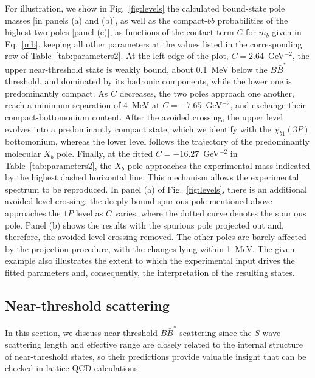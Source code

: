 \documentclass[aps,prd,showpacs,amsmath,twocolumn,superscriptaddress,floatfix,nofootinbib,notitlepage]{revtex4-2}
\newcommand{\Xb}{X_b}
\begin{document}
For illustration, we show in Fig.~\ref{fig:levels} the calculated bound-state pole masses [in panels (a) and (b)], as well as the compact-$\bar{b}b$ probabilities of the highest two poles [panel (c)], as functions of the contact term $C$ for $m_b$ given in Eq.~\eqref{mb}, keeping all other parameters at the values listed in the corresponding row of Table~\ref{tab:parameters2}.
At the left edge of the plot, $C=2.64$~GeV$^{-2}$, the upper near-threshold state is weakly bound, about 0.1~MeV below the $B\bar{B}^*$ threshold, and dominated by its hadronic components, while the lower one is predominantly compact. As $C$ decreases, the two poles approach one another, reach a minimum separation of 4~MeV at $C=-7.65$~GeV$^{-2}$, and exchange their compact-bottomonium content. After the avoided crossing, the upper level evolves into a predominantly compact state, which we identify with the $\chi_{b1}(3P)$ bottomonium, whereas the lower level follows the trajectory of the predominantly molecular $\Xb$ pole. 
Finally, at the fitted $C=-16.27$~GeV$^{-2}$ in Table~\ref{tab:parameters2}, the $\Xb$ pole approaches the experimental mass indicated by the highest dashed horizontal line. This mechanism allows the experimental spectrum to be reproduced.
In panel (a) of Fig.~\ref{fig:levels}, there is an additional avoided level crossing: the deeply bound spurious pole mentioned above approaches the $1P$ level as $C$ varies, where the dotted curve denotes the spurious pole. 
Panel (b) shows the results with the spurious pole projected out and, therefore, the avoided level crossing removed. The other poles are barely affected by the projection procedure, with the changes lying within 1~MeV.
The given example also illustrates the extent to which the experimental input drives the fitted parameters and, consequently, the interpretation of the resulting states.

\subsection{Near-threshold scattering}
\label{sec:threshold-scattering}

In this section, we discuss near-threshold $B\bar{B}^*$ scattering since the $S$-wave scattering length and effective range are closely related to the internal structure of near-threshold states, so their predictions provide valuable insight that can be checked in lattice-QCD calculations.
\end{document}
